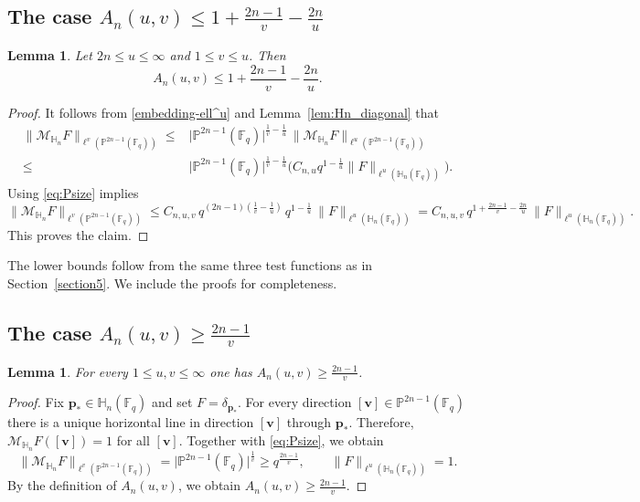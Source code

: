 \documentclass[11pt]{article}
\newtheorem{lemma}[theorem]{Lemma}
\newcommand{\1}{\mathbf 1}
\newcommand{\bfp}{\mathbf{p}}
\begin{document}
\subsection{The case $
A_n(u,v)\le 1+\frac{2n-1}{v}-\frac{2n}{u}$}
\begin{lemma}\label{lem:Hn_upper_3}
Let $2n\le u\le \infty$ and $1\le v\le u$.
Then
\[
A_n(u,v)\le 1+\frac{2n-1}{v}-\frac{2n}{u}.
\]
\end{lemma}

\begin{proof}
It follows from \eqref{embedding-ell^u} and Lemma~\ref{lem:Hn_diagonal} that 
\begin{align*}
\|\mathcal{M}_{\mathbb{H}_n}F\|_{\ell^v(\mathbb{P}^{2n-1}(\mathbb{F}_q))}
\le &
\bigl|\mathbb{P}^{2n-1}(\mathbb{F}_q)\bigr|^{\frac{1}{v}-\frac{1}{u}}\,
\|\mathcal{M}_{\mathbb{H}_n}F\|_{\ell^u(\mathbb{P}^{2n-1}(\mathbb{F}_q))} \\
\leq & 
\bigl|\mathbb{P}^{2n-1}(\mathbb{F}_q)\bigr|^{\frac{1}{v}-\frac{1}{u}} \bigg( C_{n,u} q^{1-\frac{1}{u}}\|F\|_{\ell^u(\mathbb{H}_n(\mathbb{F}_q))}  \bigg).
\end{align*}
Using \eqref{eq:Psize} implies
\[
\|\mathcal{M}_{\mathbb{H}_n}F\|_{\ell^v(\mathbb{P}^{2n-1}(\mathbb{F}_q))}
\le
C_{n,u,v}\, q^{(2n-1)(\frac{1}{v}-\frac{1}{u})}\, q^{1-\frac{1}{u}}\, \|F\|_{\ell^u(\mathbb{H}_n(\mathbb{F}_q))}
=
C_{n,u,v}\, q^{1+\frac{2n-1}{v}-\frac{2n}{u}}\,\|F\|_{\ell^u(\mathbb{H}_n(\mathbb{F}_q))}.
\]
This proves the claim.
\end{proof}



The lower bounds follow from the same three test functions as in Section~\ref{section5}.
We include the proofs for completeness.


\subsection{The case $A_n(u,v)\ge \frac{2n-1}{v}$}
\begin{lemma}\label{lem:Hn_lower_1}
For every $1\le u,v\le \infty$ one has $A_n(u,v)\ge \frac{2n-1}{v}$.
\end{lemma}

\begin{proof}
Fix $\bfp_\ast\in \mathbb{H}_n(\mathbb{F}_q)$ and set $F=\delta_{\bfp_\ast}$.
For every direction $[\mathbf{v}]\in \mathbb{P}^{2n-1}(\mathbb{F}_q)$ there is a unique horizontal line in direction $[\mathbf{v}]$ through $\bfp_\ast$.
Therefore, $\mathcal{M}_{\mathbb{H}_n}F([\mathbf{v}])=1$ for all $[\mathbf{v}]$.
Together with \eqref{eq:Psize}, we obtain
\[
\|\mathcal{M}_{\mathbb{H}_n}F\|_{\ell^v(\mathbb{P}^{2n-1}(\mathbb{F}_q))}
=
\bigl|\mathbb{P}^{2n-1}(\mathbb{F}_q)\bigr|^{\frac{1}{v}} \geq q^{\frac{2n-1}{v}},
\qquad
\|F\|_{\ell^u(\mathbb{H}_n(\mathbb{F}_q))}=1.
\]
By the definition of $A_n(u,v)$, we obtain $A_n(u,v)\ge \frac{2n-1}{v}$.
\end{proof}
\end{document}
